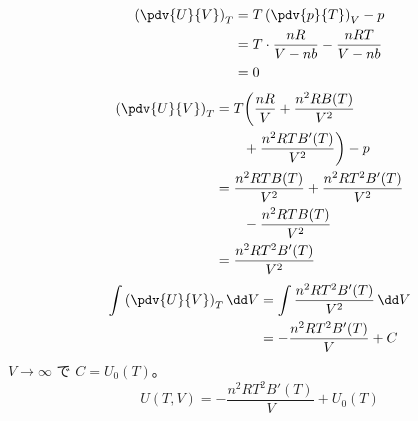 \begin{align*}
\left(\pdv{U}{V}\right)_{T}&=T\left(\pdv{p}{T}\right)_{V}-p\\
&=T\cdot\frac{nR}{V-nb}-\frac{nRT}{V-nb}\\
&=0
\end{align*}
\begin{align*}
\left(\pdv{U}{V}\right)_{T}&=T\biggl(\frac{nR}{V}+\frac{n^{2}RB(T)}{V^{2}}\\
&\qquad+\frac{n^{2}RTB'(T)}{V^{2}}\biggr)-p\\
&=\frac{n^{2}RTB(T)}{V^{2}}+\frac{n^{2}RT^{2}B'(T)}{V^{2}}\\
&\qquad-\frac{n^{2}RTB(T)}{V^{2}}\\
&=\frac{n^{2}RT^{2}B'(T)}{V^{2}}
\end{align*}
\begin{align*}
\int\left(\pdv{U}{V}\right)_{T}\dd V&=\int\frac{n^{2}RT^{2}B'(T)}{V^{2}}\,\dd V\\
&=-\frac{n^{2}RT^{2}B'(T)}{V}+C
\end{align*}
$V\to\infty$ で $C=U_{0}(T)$。
\[ U(T,V)=-\frac{n^{2}RT^{2}B'(T)}{V}+U_{0}(T) \]
